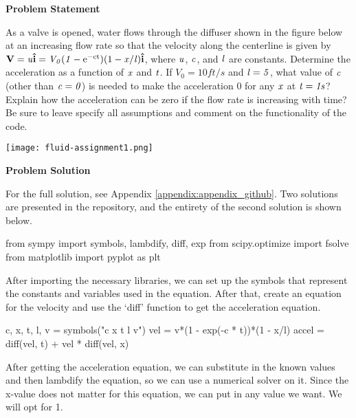 \begin{tcolorbox}[breakable, enhanced jigsaw, title=ME 571: Assignment \ref{fluid_assignment_1}, 
    colframe=ksu-purple, colback=ksu-gray]

    \textbf{Problem Statement}
    \parindent15pt

    As a valve is opened, water flows through the diffuser shown in the figure below at an increasing 
    flow rate so that the velocity along the centerline is given by 
    $ \mathbf{V} = \it{u}\mathbf{\hat{i}}  = V_0(1 - \rm{e}^{-ct})(1 - \it{x/l})\mathbf{\hat{i}} $, 
    where $\it{u}$, $ \it{c} $, and $ \it{l} $ are constants. Determine the acceleration as 
    a function of $ \it{x} $ and $ \it{t} $. If $ V_0 = 10 ft/s $ and $ \it{l} = 5 $, what value 
    of $ \it{c} $ (other than $ \it{c} = 0 $) is needed to make the acceleration 0 for any 
    $ \it{x} $ at $ \it{t} = 1s $? Explain how the acceleration can be zero if the flow rate 
    is increasing with time? Be sure to leave specify all assumptions and comment on the 
    functionality of the code.

    \begin{center}
        \texttt{[image: fluid-assignment1.png]} 
    \end{center}

    \tcblower
    \textbf{Problem Solution}
    \parindent15pt

    For the full solution, see Appendix \ref{appendix:appendix_github}. Two solutions are 
    presented in the repository, and the entirety of the second solution is shown below.

\begin{python}
from sympy import symbols, lambdify, diff, exp
from scipy.optimize import fsolve
from matplotlib import pyplot as plt
\end{python}

After importing the necessary libraries, we can set up the symbols that represent the 
constants and variables used in the equation. After that, create an equation for the 
velocity and use the `diff' function to get the acceleration equation.

\begin{python}
c, x, t, l, v = symbols("c x t l v")
vel = v*(1 - exp(-c * t))*(1 - x/l)
accel = diff(vel, t) + vel * diff(vel, x)
\end{python}

After getting the acceleration equation, we can substitute in the known values and then 
lambdify the equation, so we can use a numerical solver on it. Since the x-value does 
not matter for this equation, we can put in any value we want. We will opt for 1.


\end{tcolorbox}
